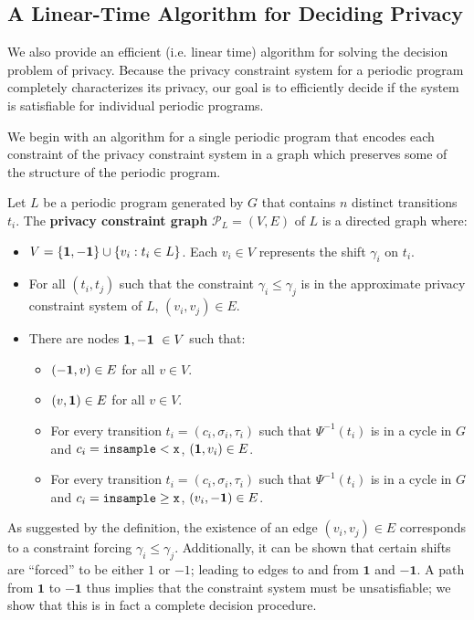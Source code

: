 
\subsection{A Linear-Time Algorithm for Deciding Privacy}\label{decisionSection}

We also provide an efficient (i.e. linear time) algorithm for solving the decision problem of privacy.
Because the privacy constraint system for a periodic program completely characterizes its privacy, our goal is to efficiently decide if the system is satisfiable for individual periodic programs.

We begin with an algorithm for a single periodic program that encodes each constraint of the privacy constraint system in a graph which preserves some of the structure of the periodic program. 

\begin{defn}
    Let $L$ be a periodic program generated by $G$ that contains $n$ distinct transitions $t_i$. The \textbf{privacy constraint graph} $\mathcal{P}_L = (V, E)$ of $L$ is a directed graph where: 
    \begin{itemize}
        \item $V = \{{\bf 1, -1}\} \cup \{v_i: t_i\in L\}$. Each $v_i \in V$ represents the shift $\gamma_i$ on $t_i$.
        \item For all $(t_i, t_j)$ such that the constraint $\gamma_i \leq \gamma_j$ is in the approximate privacy constraint system of $L$, $(v_i, v_j) \in E$.
        \item There are nodes ${\bf 1, -1}\ \in V$ such that: 
        \begin{itemize}
            \item $({\bf -1}, v)\in E$ for all $v \in V$.
            \item $(v, {\bf 1})\in E$ for all $v \in V$.
            \item For every transition $t_i = (c_i, \sigma_i, \tau_i)$ such that $\Psi^{-1}(t_i)$ is in a cycle in $G$ and $c_i = \lguard[\texttt{x}]$, $({\bf 1}, v_i) \in E$.
            \item For every transition $t_i = (c_i, \sigma_i, \tau_i)$ such that $\Psi^{-1}(t_i)$ is in a cycle in $G$ and $c_i = \gguard[\texttt{x}]$, $(v_i, {\bf -1}) \in E$. 
        \end{itemize}
    \end{itemize}
\end{defn}

As suggested by the definition, the existence of an edge $(v_i, v_j)\in E$ corresponds to a constraint forcing $\gamma_i \leq \gamma_j$. Additionally, it can be shown that certain shifts are ``forced'' to be either $1$ or $-1$; leading to edges to and from $\mathbf{1}$ and $\mathbf{-1}$. 
A path from $\mathbf{1}$ to $\mathbf{-1}$ thus implies that the constraint system must be unsatisfiable; we show that this is in fact a complete decision procedure.

